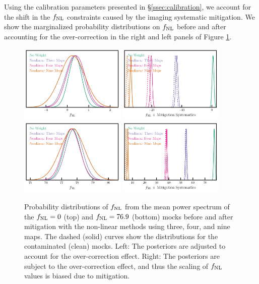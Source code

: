 Using the calibration parameters presented in \S \ref{ssec:calibration}, we account for the shift in the $f_{\rm NL}$ constraints caused by the imaging systematic mitigation. We show the marginalized probability distributions on $f_{\rm NL}$ before and after accounting for the over-correction in the right and left panels of Figure \ref{fig:contmcmc}.

\begin{figure}
\centering
\includegraphics[width=0.45\textwidth]{figures/mcmc_cont.pdf}
\includegraphics[width=0.45\textwidth]{figures/mcmc_contnoshift.pdf}
\includegraphics[width=0.45\textwidth]{figures/mcmcp_cont.pdf}
\includegraphics[width=0.45\textwidth]{figures/mcmcp_contnoshift.pdf}
\caption{Probability distributions of $f_{\rm NL}$ from the mean power spectrum of the $f_{\rm NL}=0$ (top) and $f_{\rm NL}=76.9$ (bottom) mocks before and after mitigation with the non-linear methods using three, four, and nine maps. The dashed (solid) curves show the distributions for the contaminated (clean) mocks. Left: The posteriors are adjusted to account for the over-correction effect. Right: The posteriors are subject to the over-correction effect, and thus the scaling of $f_{\rm NL}$ values is biased due to mitigation.}\label{fig:contmcmc}
\end{figure}


